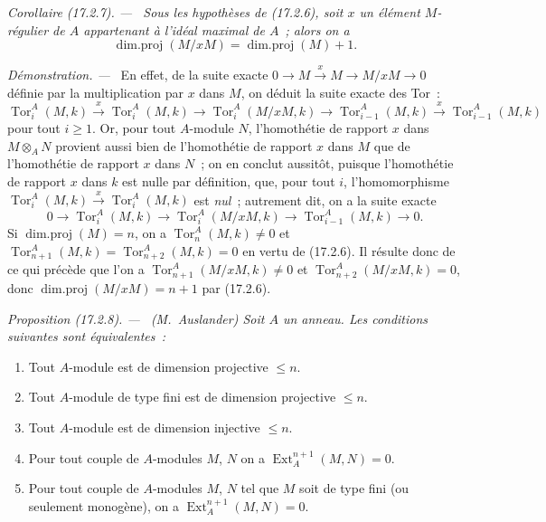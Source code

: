 \documentclass[10pt,oneside]{book}
\makeatletter
\newcommand{\setmanualcurrentlabel}[1]{\def\@currentlabel{#1}}
\newenvironment{proposition}[1][]{%
  \setmanualcurrentlabel{#1}\par\medskip\noindent\itshape Proposition (#1). ---\ }{\par}
\newenvironment{corollary}[1][]{%
  \setmanualcurrentlabel{#1}\par\medskip\noindent\itshape Corollaire (#1). ---\ }{\par}
\newenvironment{proof}{%
  \par\medskip\noindent\textit{Démonstration. ---\ }}{\par}
\makeatother
\begin{document}
\begin{corollary}[17.2.7]
\label{0.17.2.7-fr}
Sous les hypothèses de (17.2.6), soit $x$ un élément $M$-régulier de $A$
appartenant à l'idéal maximal de $A$~; alors on a
\begin{equation}
\label{0.17.2.7.1-fr}
\tag{17.2.7.1}
  \operatorname{dim.proj}(M/xM)=\operatorname{dim.proj}(M)+1.
\end{equation}
\end{corollary}

\begin{proof}
En effet, de la suite exacte
$0\longrightarrow M\xrightarrow{x}M\longrightarrow M/xM\longrightarrow0$
définie par la multiplication par $x$ dans $M$, on déduit la suite exacte des
Tor~:
\[
  \operatorname{Tor}^A_i(M,k)\xrightarrow{x}
  \operatorname{Tor}^A_i(M,k)\longrightarrow
  \operatorname{Tor}^A_i(M/xM,k)\longrightarrow
  \operatorname{Tor}^A_{i-1}(M,k)\xrightarrow{x}
  \operatorname{Tor}^A_{i-1}(M,k)
\]
pour tout $i\geq1$. Or, pour tout $A$-module $N$, l'homothétie de rapport $x$
dans $M\otimes_A N$ provient aussi bien de l'homothétie de rapport $x$ dans
$M$ que de l'homothétie de rapport $x$ dans $N$~; on en conclut aussitôt,
puisque l'homothétie de rapport $x$ dans $k$ est nulle par définition, que,
pour tout $i$, l'homomorphisme
$\operatorname{Tor}^A_i(M,k)\xrightarrow{x}\operatorname{Tor}^A_i(M,k)$ est
\emph{nul}~; autrement dit, on a la suite exacte
\[
  0\longrightarrow\operatorname{Tor}^A_i(M,k)\longrightarrow
  \operatorname{Tor}^A_i(M/xM,k)\longrightarrow
  \operatorname{Tor}^A_{i-1}(M,k)\longrightarrow0.
\]
Si $\operatorname{dim.proj}(M)=n$, on a
$\operatorname{Tor}^A_n(M,k)\neq0$ et
$\operatorname{Tor}^A_{n+1}(M,k)=\operatorname{Tor}^A_{n+2}(M,k)=0$ en vertu
de (17.2.6). Il résulte donc de ce qui précède que l'on a
$\operatorname{Tor}^A_{n+1}(M/xM,k)\neq0$ et
$\operatorname{Tor}^A_{n+2}(M/xM,k)=0$, donc
$\operatorname{dim.proj}(M/xM)=n+1$ par (17.2.6).
\end{proof}

\begin{proposition}[17.2.8]
\label{0.17.2.8-fr}
\textnormal{(M.~Auslander)} Soit $A$ un anneau. Les conditions suivantes sont
équivalentes~:
\begin{enumerate}
  \item[\rm a)] Tout $A$-module est de dimension projective $\leq n$.
  \item[\rm a')] Tout $A$-module de type fini est de dimension projective
  $\leq n$.
  \item[\rm b)] Tout $A$-module est de dimension injective $\leq n$.
  \item[\rm c)] Pour tout couple de $A$-modules $M$, $N$ on a
  $\operatorname{Ext}^{n+1}_A(M,N)=0$.
  \item[\rm c')] Pour tout couple de $A$-modules $M$, $N$ tel que $M$ soit de
  type fini (ou seulement monogène), on a
  $\operatorname{Ext}^{n+1}_A(M,N)=0$.
\end{enumerate}
\end{proposition}
\end{document}
